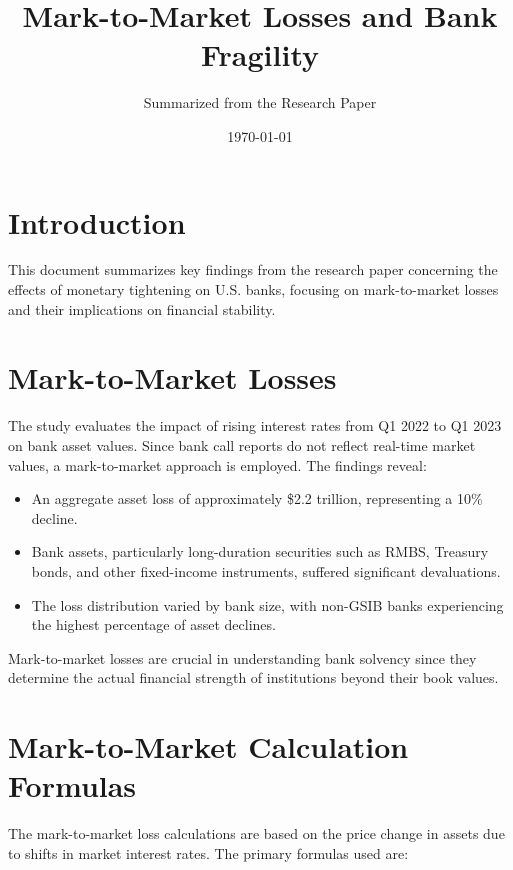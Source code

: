 \documentclass{article}
\title{Mark-to-Market Losses and Bank Fragility}
\author{Summarized from the Research Paper}
\date{\today}
\begin{document}
\maketitle

\section{Introduction}
This document summarizes key findings from the research paper concerning the effects of monetary tightening on U.S. banks, focusing on mark-to-market losses and their implications on financial stability.

\section{Mark-to-Market Losses}
The study evaluates the impact of rising interest rates from Q1 2022 to Q1 2023 on bank asset values. Since bank call reports do not reflect real-time market values, a mark-to-market approach is employed. The findings reveal:

\begin{itemize}
    \item An aggregate asset loss of approximately \$2.2 trillion, representing a 10\% decline.
    \item Bank assets, particularly long-duration securities such as RMBS, Treasury bonds, and other fixed-income instruments, suffered significant devaluations.
    \item The loss distribution varied by bank size, with non-GSIB banks experiencing the highest percentage of asset declines.
\end{itemize}

Mark-to-market losses are crucial in understanding bank solvency since they determine the actual financial strength of institutions beyond their book values.

\section{Mark-to-Market Calculation Formulas}
The mark-to-market loss calculations are based on the price change in assets due to shifts in market interest rates. The primary formulas used are:
\end{document}
